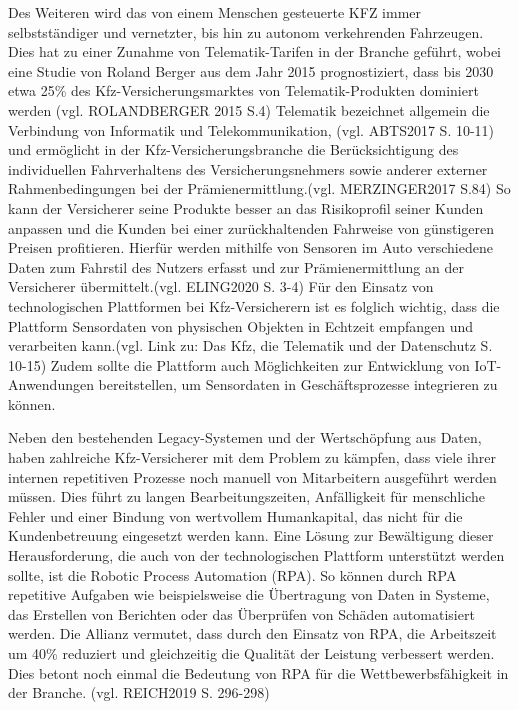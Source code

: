 Des Weiteren wird das von einem Menschen gesteuerte KFZ immer selbstständiger und vernetzter, bis hin zu autonom verkehrenden Fahrzeugen. Dies hat zu einer Zunahme von Telematik-Tarifen in der Branche geführt, wobei eine Studie von Roland Berger aus dem Jahr 2015 prognostiziert, dass bis 2030 etwa 25\% des Kfz-Versicherungsmarktes von Telematik-Produkten dominiert werden (vgl. ROLANDBERGER 2015 S.4)  Telematik bezeichnet allgemein die Verbindung von Informatik und Telekommunikation, (vgl. ABTS2017 S. 10-11) und ermöglicht in der Kfz-Versicherungsbranche die Berücksichtigung des individuellen Fahrverhaltens des Versicherungsnehmers sowie anderer externer Rahmenbedingungen bei der Prämienermittlung.(vgl. MERZINGER2017 S.84) So kann der Versicherer seine Produkte besser an das Risikoprofil seiner Kunden anpassen und die Kunden bei einer zurückhaltenden Fahrweise von günstigeren Preisen profitieren. Hierfür werden mithilfe von Sensoren im Auto verschiedene Daten zum Fahrstil des Nutzers erfasst und zur Prämienermittlung an der Versicherer übermittelt.(vgl. ELING2020 S. 3-4) Für den Einsatz von technologischen Plattformen bei Kfz-Versicherern ist es folglich wichtig, dass die Plattform Sensordaten von physischen Objekten in Echtzeit empfangen und verarbeiten kann.(vgl. Link zu: Das Kfz, die Telematik und der Datenschutz S. 10-15) Zudem sollte die Plattform auch Möglichkeiten zur Entwicklung von IoT-Anwendungen bereitstellen, um Sensordaten in Geschäftsprozesse integrieren zu können.

Neben den bestehenden Legacy-Systemen und der Wertschöpfung aus Daten, haben zahlreiche Kfz-Versicherer mit dem Problem zu kämpfen, dass viele ihrer internen repetitiven Prozesse noch manuell von Mitarbeitern ausgeführt werden müssen. Dies führt zu langen Bearbeitungszeiten, Anfälligkeit für menschliche Fehler und einer Bindung von wertvollem Humankapital, das nicht für die Kundenbetreuung eingesetzt werden kann. Eine Lösung zur Bewältigung dieser Herausforderung, die auch von der technologischen Plattform unterstützt werden sollte, ist die Robotic Process Automation (RPA). So können durch RPA repetitive Aufgaben wie beispielsweise die Übertragung von Daten in Systeme, das Erstellen von Berichten oder das Überprüfen von Schäden automatisiert werden. Die Allianz vermutet, dass durch den Einsatz von RPA, die Arbeitszeit um 40\% reduziert und gleichzeitig die Qualität der Leistung verbessert werden. Dies betont noch einmal die Bedeutung von RPA für die Wettbewerbsfähigkeit in der Branche. (vgl. REICH2019 S. 296-298)

